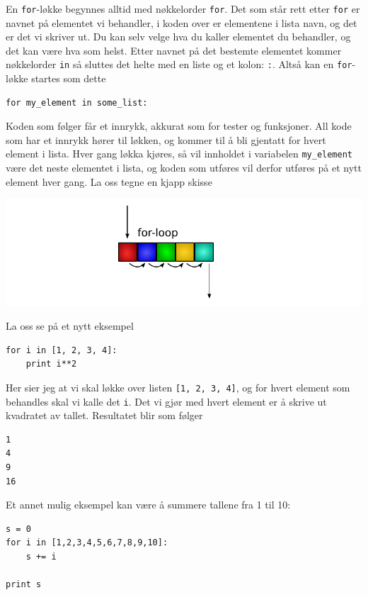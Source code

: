 \documentclass[a4paper, 11pt, notitlepage]{article}
\begin{document}
En \verb+for+-løkke begynnes alltid med nøkkelorder \verb+for+. Det som står rett etter \verb+for+ er navnet på elementet vi behandler, i koden over er elementene i lista navn, og det er det vi skriver ut. Du kan selv velge hva du kaller elementet du behandler, og det kan være hva som helst. Etter navnet på det bestemte elementet kommer nøkkelorder \verb+in+ så sluttes det helte med en liste og et kolon: \verb+:+. Altså kan en \verb+for+-løkke startes som dette
\begin{lstlisting}
for my_element in some_list:
\end{lstlisting}
Koden som følger får et innrykk, akkurat som for tester og funksjoner. All kode som har et innrykk hører til løkken, og kommer til å bli gjentatt for hvert element i lista. Hver gang løkka kjøres, så vil innholdet i variabelen \verb+my_element+ være det neste elementet i lista, og koden som utføres vil derfor utføres på et nytt element hver gang. La oss tegne en kjapp skisse

\begin{centering}
	\includegraphics[width=\textwidth]{fig/for_loop}
\end{centering}

La oss se på et nytt eksempel
\begin{lstlisting}
for i in [1, 2, 3, 4]:
	print i**2
\end{lstlisting}
Her sier jeg at vi skal løkke over listen \verb+[1, 2, 3, 4]+, og for hvert element som behandles skal vi kalle det \verb+i+. Det vi gjør med hvert element er å skrive ut kvadratet av tallet. Resultatet blir som følger
\begin{verbatim}
1
4
9
16
\end{verbatim}

Et annet mulig eksempel kan være å summere tallene fra 1 til 10:
\begin{lstlisting}
s = 0
for i in [1,2,3,4,5,6,7,8,9,10]:
	s += i

print s
\end{lstlisting}
\end{document}
